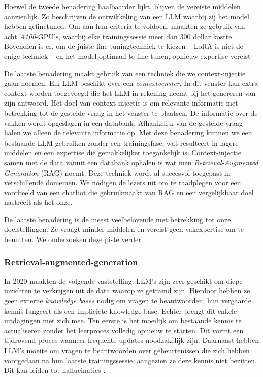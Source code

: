 Hoewel de tweede benadering haalbaarder lijkt, blijven de vereiste middelen aanzienlijk. Zo beschrijven \textcite{Chiang2023} de ontwikkeling van een LLM waarbij zij het model hebben gefinetuned. Om aan hun criteria te voldoen, maakten ze gebruik van acht \textit{A100}-GPU's, waarbij elke trainingssessie meer dan 300 dollar kostte. Bovendien is er, om de juiste fine-tuningtechniek te kiezen – LoRA is niet de enige techniek – en het model optimaal te fine-tunen, opnieuw expertise vereist

De laatste benadering maakt gebruik van een techniek die we context-injectie gaan noemen. Elk LLM beschikt over een \textit{contextvenster}. In dit venster kan extra context worden toegevoegd die het LLM in rekening neemt bij het genereren van zijn antwoord. Het doel van context-injectie is om relevante informatie met betrekking tot de gestelde vraag in het venster te plaatsen. De informatie over de vakken wordt opgeslagen in een databank. Afhankelijk van de gestelde vraag halen we alleen de relevante informatie op. Met deze benadering kunnen we een bestaande LLM gebruiken zonder een trainingsfase, wat resulteert in lagere middelen en een expertise die gemakkelijker toegankelijk is. Context-injectie samen met de data vanuit een databank ophalen is wat men \textit{Retrieval-Augmented Generation} (RAG) noemt. Deze techniek wordt al succesvol toegepast in verschillende domeinen. We nodigen de lezers uit om \textcite{Wang2024} te raadplegen voor een voorbeeld van een chatbot die gebruikmaakt van RAG en een vergelijkbaar doel nastreeft als het onze.

De laatste benadering is de meest veelbelovende met betrekking tot onze doelstellingen. Ze vraagt minder middelen en vereist geen vakexpertise om te benutten. We onderzoeken deze piste verder.

\subsubsection{Retrieval-augmented-generation}

In 2020 maakten \textcite{Lewis2020} de volgende vaststelling: LLM's zijn zeer geschikt om diepe inzichten te verkrijgen uit de data waarop ze getraind zijn. Hierdoor hebben ze geen externe \textit{knowledge bases} nodig om vragen te beantwoorden; hun vergaarde kennis fungeert als een impliciete knowledge base. Echter brengt dit enkele uitdagingen met zich mee. Ten eerste is het moeilijk om bestaande kennis te actualiseren zonder het leerproces volledig opnieuw te starten. Dit vormt een tijdrovend proces wanneer frequente updates noodzakelijk zijn. Daarnaast hebben LLM's moeite om vragen te beantwoorden over gebeurtenissen die zich hebben voorgedaan na hun laatste trainingssessie, aangezien ze deze kennis niet bezitten. Dit kan leiden tot hallucinaties \autocite{Gao2023}.

